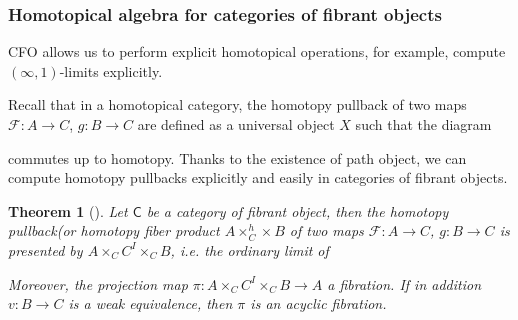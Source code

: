\documentclass[12pt]{amsart}
\newtheorem{thm}{Theorem}[section]
\theoremstyle{definition}
\theoremstyle{remark}
\numberwithin{equation}{section}
\newcommand{\CC}{{\mathsf C}}
\newcommand{\1}{{\mathbb{1}}}
\newcommand{\f}{\mathcal{F}}
\newcommand{\io}{\operatorname{(\infty, 1)}}
\begin{document}
\subsubsection{Homotopical algebra for categories of fibrant objects}
CFO allows us to perform explicit homotopical operations, for example, compute $\io$-limits explicitly.

Recall that in a homotopical category, the homotopy pullback of two maps $\f: A\to C$, $g: B\to C$ are defined as a universal object $X$ such that the diagram
\begin{center}
\end{center}
commutes up to homotopy. Thanks to the existence of path object, we can compute homotopy pullbacks explicitly and easily in categories of fibrant objects.

\begin{thm}[\cite{Bro73}]\label{hfiber}
Let $\CC$ be a category of fibrant object, then the {\it homotopy pullback}(or {\it homotopy fiber product} $A\times^h_C\times B$ of two maps $\f: A\to C$, $g: B\to C$ is presented by $A\times_C C^I \times_C B$, i.e. the ordinary limit of
    \begin{center}
    \end{center}
    Moreover, the projection map $\pi: A\times_C C^I \times_C B \to A$ a fibration. If in addition $v:B\to C$ is a weak equivalence, then $\pi$ is an acyclic fibration.
\end{thm}
\end{document}
